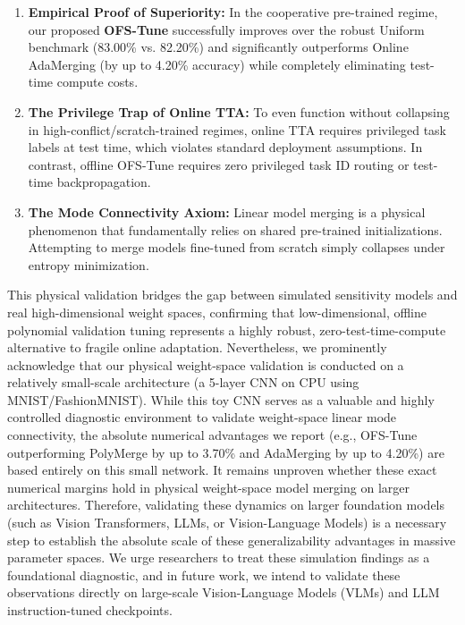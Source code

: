 \begin{enumerate}
    \item \textbf{Empirical Proof of Superiority:} In the cooperative pre-trained regime, our proposed \textbf{OFS-Tune} successfully improves over the robust Uniform benchmark (83.00\% vs.
82.20\%) and significantly outperforms Online AdaMerging (by up to 4.20\% accuracy) while completely eliminating test-time compute costs.
    \item \textbf{The Privilege Trap of Online TTA:} To even function without collapsing in high-conflict/scratch-trained regimes, online TTA requires privileged task labels at test time, which violates standard deployment assumptions.
In contrast, offline OFS-Tune requires zero privileged task ID routing or test-time backpropagation.
    \item \textbf{The Mode Connectivity Axiom:} Linear model merging is a physical phenomenon that fundamentally relies on shared pre-trained initializations.
Attempting to merge models fine-tuned from scratch simply collapses under entropy minimization.
\end{enumerate}
This physical validation bridges the gap between simulated sensitivity models and real high-dimensional weight spaces, confirming that low-dimensional, offline polynomial validation tuning represents a highly robust, zero-test-time-compute alternative to fragile online adaptation.
Nevertheless, we prominently acknowledge that our physical weight-space validation is conducted on a relatively small-scale architecture (a 5-layer CNN on CPU using MNIST/FashionMNIST).
While this toy CNN serves as a valuable and highly controlled diagnostic environment to validate weight-space linear mode connectivity, the absolute numerical advantages we report (e.g., OFS-Tune outperforming PolyMerge by up to 3.70\% and AdaMerging by up to 4.20\%) are based entirely on this small network.
It remains unproven whether these exact numerical margins hold in physical weight-space model merging on larger architectures.
Therefore, validating these dynamics on larger foundation models (such as Vision Transformers, LLMs, or Vision-Language Models) is a necessary step to establish the absolute scale of these generalizability advantages in massive parameter spaces.
We urge researchers to treat these simulation findings as a foundational diagnostic, and in future work, we intend to validate these observations directly on large-scale Vision-Language Models (VLMs) and LLM instruction-tuned checkpoints.
